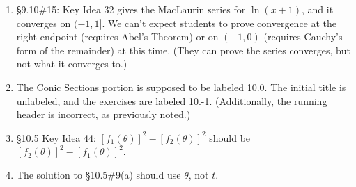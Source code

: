 \documentclass{amsart}
\begin{document}
\begin{enumerate}
\item \S9.10\#15: Key Idea 32 gives the MacLaurin series for $\ln(x+1)$, and it converges on $(-1,1]$.  We can't expect students to prove convergence at the right endpoint (requires Abel's Theorem) or on $(-1,0)$ (requires Cauchy's form of the remainder) at this time.  (They can prove the series converges, but not what it converges to.)
\item The Conic Sections portion is supposed to be labeled 10.0.  The initial title is unlabeled, and the exercises are labeled 10.-1.  (Additionally, the running header is incorrect, as previously noted.)
\item \S10.5 Key Idea 44: $[f_1(\theta)]^2 - [f_2(\theta)]^2$ should be $[f_2(\theta)]^2 - [f_1(\theta)]^2$.
\item The solution to \S10.5\#9(a) should use $\theta$, not $t$.
\label{2017-01-00IIplus}
\end{enumerate}

\end{document}

